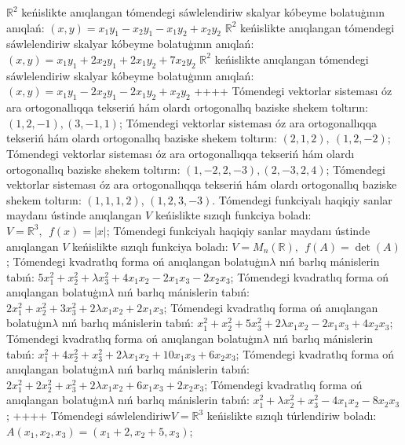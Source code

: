 \(\mathbb{R}^{2}\) keńislikte anıqlangan tómendegi sáwlelendiriw skalyar kóbeyme bolatuģının anıqlań: \((x,y) = x_{1}y_{1} - x_{2}y_{1} - x_{1}y_{2} + x_{2}y_{2}\)
\(\mathbb{R}^{2}\) keńislikte anıqlangan tómendegi sáwlelendiriw skalyar kóbeyme bolatuģının anıqlań: \((x,y) = x_{1}y_{1} + 2x_{2}y_{1} + 2x_{1}y_{2} + 7x_{2}y_{2}\)
\(\mathbb{R}^{2}\) keńislikte anıqlangan tómendegi sáwlelendiriw skalyar kóbeyme bolatuģının anıqlań: \((x,y) = x_{1}y_{1} - 2x_{2}y_{1} - 2x_{1}y_{2} + x_{2}y_{2}\)
++++
Tómendegi vektorlar sisteması óz ara ortogonallıqqa tekseriń hám olardı ortogonallıq baziske shekem toltırın: \((1,2, - 1),(3, - 1,1)\);
Tómendegi vektorlar sisteması óz ara ortogonallıqqa tekseriń hám olardı ortogonallıq baziske shekem toltırın: \((2,1,2),\ (1,2, - 2)\);
Tómendegi vektorlar sisteması óz ara ortogonallıqqa tekseriń hám olardı ortogonallıq baziske shekem toltırın: \((1, - 2,2, - 3),(2, - 3,2,4)\);
Tómendegi vektorlar sisteması óz ara ortogonallıqqa tekseriń hám olardı ortogonallıq baziske shekem toltırın: \((1,1,1,2)\), \((1,2,3, - 3)\).
Tómendegi funkciyalı haqiqiy sanlar maydanı ústinde anıqlangan \(V\) keńislikte sızıqlı funkciya boladı: \(V = \mathbb{R}^{3},\ \ f(x) = |x|\);
Tómendegi funkciyalı haqiqiy sanlar maydanı ústinde anıqlangan \(V\) keńislikte sızıqlı funkciya boladı: \(V = M_{n}\left( \mathbb{R} \right),\ \ f(A) = \det(A)\);
Tómendegi kvadratlıq forma oń anıqlangan bolatuģın\(\lambda\) nıń barlıq mánislerin tabıń: \(5x_{1}^{2} + x_{2}^{2} + \lambda x_{3}^{2} + 4x_{1}x_{2} - 2x_{1}x_{3} - 2x_{2}x_{3}\);
Tómendegi kvadratlıq forma oń anıqlangan bolatuģın\(\lambda\) nıń barlıq mánislerin tabıń: \(2x_{1}^{2} + x_{2}^{2} + 3x_{3}^{2} + 2\lambda x_{1}x_{2} + 2x_{1}x_{3}\);
Tómendegi kvadratlıq forma oń anıqlangan bolatuģın\(\lambda\) nıń barlıq mánislerin tabıń: \(x_{1}^{2} + x_{2}^{2} + 5x_{3}^{2} + 2\lambda x_{1}x_{2} - 2x_{1}x_{3} + 4x_{2}x_{3}\);
Tómendegi kvadratlıq forma oń anıqlangan bolatuģın\(\lambda\) nıń barlıq mánislerin tabıń: \(x_{1}^{2} + 4x_{2}^{2} + x_{3}^{2} + 2\lambda x_{1}x_{2} + 10x_{1}x_{3} + 6x_{2}x_{3}\);
Tómendegi kvadratlıq forma oń anıqlangan bolatuģın\(\lambda\) nıń barlıq mánislerin tabıń: \(2x_{1}^{2} + 2x_{2}^{2} + x_{3}^{2} + 2\lambda x_{1}x_{2} + 6x_{1}x_{3} + 2x_{2}x_{3}\);
Tómendegi kvadratlıq forma oń anıqlangan bolatuģın\(\lambda\) nıń barlıq mánislerin tabıń: \(x_{1}^{2} + \lambda x_{2}^{2} + x_{3}^{2} - 4x_{1}x_{2} - 8x_{2}x_{3}\);
++++
Tómendegi sáwlelendiriw\(V = \mathbb{R}^{3}\) keńislikte sızıqlı túrlendiriw boladı: \(A\left( x_{1},x_{2},x_{3} \right) = \left( x_{1} + 2,x_{2} + 5,x_{3} \right)\);
